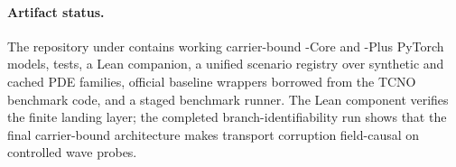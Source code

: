 \paragraph{Artifact status.}
The repository under  contains working carrier-bound \MiNO-Core and \MiNO-Plus PyTorch models, tests, a Lean companion, a unified scenario registry over synthetic and cached PDE families, official baseline wrappers borrowed from the TCNO benchmark code, and a staged benchmark runner. The Lean component verifies the finite landing layer; the completed branch-identifiability run shows that the final carrier-bound architecture makes transport corruption field-causal on controlled wave probes.
